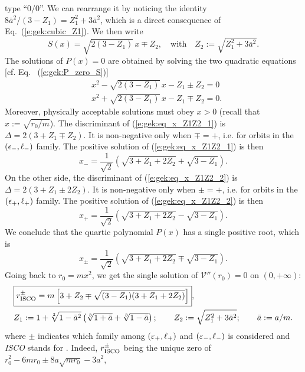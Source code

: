 type ``$0/0$''. We can rearrange it by noticing the identity
${8 \bar{a}^2}/(3 - Z_1) = Z_1^2 + 3 \bar{a}^2$, which is a direct consequence of
Eq.~(\ref{e:gek:cubic_Z1}). We then write
\[
     S(x) = \sqrt{2(3-Z_1)} \, x \mp Z_2,\quad\mbox{with}\quad
    Z_2 := \sqrt{Z_1^2  + 3 \bar{a}^2} .
\]
The solutions of $P(x)=0$ are obtained by solving the two quadratic equations
[cf. Eq.~ (\ref{e:gek:P_zero_S})]
\begin{subequations}
\begin{align}
& x^2 - \sqrt{2(3-Z_1)}\, x - Z_1 \pm Z_2 = 0 \label{e:gek:eq_x_Z1Z2_1} \\
& x^2 + \sqrt{2(3-Z_1)}\, x - Z_1 \mp Z_2 = 0 .  \label{e:gek:eq_x_Z1Z2_2}
\end{align}
\end{subequations}
Moreover, physically acceptable solutions must obey $x>0$ (recall that
$x := \sqrt{r_0/m}$). The discriminant of (\ref{e:gek:eq_x_Z1Z2_1}) is
$\Delta = 2(3+Z_1\mp Z_2)$. It is non-negative only when $\mp = +$, i.e.
for orbits in the $(\epsilon_-,\ell_-)$ family. The positive solution of (\ref{e:gek:eq_x_Z1Z2_1})
is then
\[
    x_- = \frac{1}{\sqrt{2}} \left( \sqrt{3 + Z_1 + 2 Z_2} + \sqrt{3- Z_1} \right) .
\]
On the other side, the discriminant of (\ref{e:gek:eq_x_Z1Z2_2})
is $\Delta = 2(3+Z_1 \pm 2 Z_2)$. It is non-negative only when $\pm = +$, i.e.
for orbits in the $(\epsilon_+,\ell_+)$ family. The positive solution of (\ref{e:gek:eq_x_Z1Z2_2})
is then
\[
    x_+ = \frac{1}{\sqrt{2}} \left( \sqrt{3 + Z_1 + 2 Z_2} - \sqrt{3- Z_1} \right) .
\]
We conclude that the quartic polynomial $P(x)$ has a single positive root, which
is
\[
    x_\pm = \frac{1}{\sqrt{2}}\left( \sqrt{3 + Z_1 + 2 Z_2} \mp \sqrt{3- Z_1} \right) .
\]
Going back to $r_0 = m x^2$, we get the single solution of $\mathcal{V}''(r_0) = 0$
on $(0, +\infty)$:
\begin{align}
 & \fbox{$\displaystyle r_{\rm ISCO}^\pm = m \left[ 3 + Z_2 \mp \sqrt{(3 - Z_1)(3 + Z_1 + 2 Z_2)} \right] $} ,
    \label{e:gek:r_ISCO} \\
&  Z_1 := 1 + \sqrt[3]{1 - \bar{a}^2} \left( \sqrt[3]{1 + \bar{a}} + \sqrt[3]{1 - \bar{a}} \right) ; \qquad
  Z_2 := \sqrt{Z_1^2  + 3 \bar{a}^2} ; \qquad \bar{a} := a/m .\nonumber
\end{align}
where $\pm$ indicates which family among $(\varepsilon_+,\ell_+)$ and $(\varepsilon_-,\ell_-)$ is
considered and \emph{ISCO} stands for .
Indeed, $r_{\rm ISCO}^\pm $ being the unique zero of $r_0^2 - 6 m r_0 \pm 8 a \sqrt{m r_0} - 3 a^2$,
